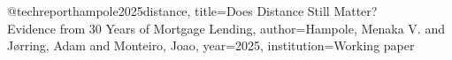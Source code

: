 @techreport{hampole2025distance,
  title={Does Distance Still Matter? \\Evidence from 30 Years of Mortgage Lending},
  author={Hampole, Menaka V. and J\o{}rring, Adam and Monteiro, Joao},
  year={2025},
  institution={Working paper}
}